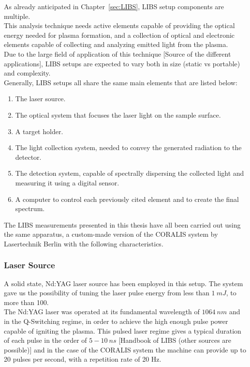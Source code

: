 As already anticipated in Chapter~\ref{sec:LIBS}, LIBS setup components are multiple.
\\
This analysis technique needs active elements capable of providing the optical energy needed for plasma formation, and a collection of optical and electronic elements capable of collecting and analyzing emitted light from the plasma.
\\
Due to the large field of application of this technique [Source of the different applications], LIBS setups are expected to vary both in size (static vs portable) and complexity.
\\
Generally, LIBS setups all share the same main elements that are listed below:
\begin{enumerate}
    \item The laser source.
    \item The optical system that focuses the laser light on the sample surface.
    \item A target holder.
    \item The light collection system, needed to convey the generated radiation to the detector.
    \item The detection system, capable of spectrally dispersing the collected light and measuring it using a digital sensor.
    \item A computer to control each previously cited element and to create the final spectrum.
\end{enumerate}
The LIBS measurements presented in this thesis have all been carried out using the same apparatus, a custom-made version of the CORALIS system by Lasertechnik Berlin with the following characteristics.

\subsubsection{Laser Source}
\label{subsubsec:laster_source}
A solid state, Nd:YAG laser source has been employed in this setup. The system gave us the possibility of tuning the laser pulse energy from less than $1 \: mJ$,  to more than 100.
\\
The Nd:YAG laser was operated at its fundamental wavelength of $1064 \: nm$ and in the Q-Switching regime, in order to achieve the high enough pulse power capable of igniting the plasma. This pulsed laser regime gives a typical duration of each pulse in the order of $5-10\: ns$ [Handbook of LIBS (other sources are possible)] and in the case of the CORALIS system the machine can provide up to 20 pulses per second, with a repetition rate of 20 Hz.

